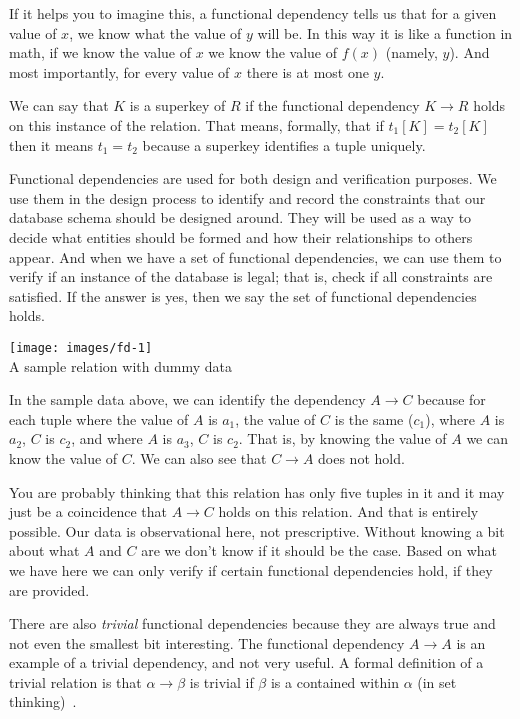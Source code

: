 \documentclass[a4paper]{report}
\begin{document}
If it helps you to imagine this, a functional dependency tells us that for a given value of $x$, we know what the value of $y$ will be. In this way it is like a function in math, if we know the value of $x$ we know the value of $f(x)$ (namely, $y$). And most importantly, for every value of $x$ there is at most one $y$. 

We can say that $K$ is a superkey of $R$ if the functional dependency $K \rightarrow R$ holds on this instance of the relation. That means, formally, that if $t_{1}[K] = t_{2}[K]$ then it means $t_{1} = t_{2}$ because a superkey identifies a tuple uniquely.

Functional dependencies are used for both design and verification purposes. We use them in the design process to identify and record the constraints that our database schema should be designed around. They will be used as a way to decide what entities should be formed and how their relationships to others appear. And when we have a set of functional dependencies, we can use them to verify if an instance of the database is legal; that is, check if all constraints are satisfied. If the answer is yes, then we say the set of functional dependencies holds.
 
\begin{center}
\texttt{[image: images/fd-1]}\\
A sample relation with dummy data~\cite{dsc}
\end{center}

In the sample data above, we can identify the dependency $A \rightarrow C$ because for each tuple where the value of $A$ is $a_{1}$, the value of $C$ is the same ($c_{1}$), where $A$ is $a_{2}$, $C$ is $c_{2}$, and where $A$ is $a_{3}$, $C$ is $c_{2}$. That is, by knowing the value of $A$ we can know the value of $C$. We can also see that $C \rightarrow A$ does not hold.

You are probably thinking that this relation has only five tuples in it and it may just be a coincidence that $A \rightarrow C$ holds on this relation. And that is entirely possible. Our data is observational here, not prescriptive. Without knowing a bit about what $A$ and $C$ are we don't know if it should be the case. Based on what we have here we can only verify if certain functional dependencies hold, if they are provided. 

There are also \textit{trivial} functional dependencies because they are always true and not even the smallest bit interesting. The functional dependency $A \rightarrow A$ is an example of a trivial dependency, and not very useful. A formal definition of a trivial relation is that $\alpha \rightarrow \beta$ is trivial if $\beta$ is a contained within $\alpha$ (in set thinking)~\cite{dsc}.
\end{document}
